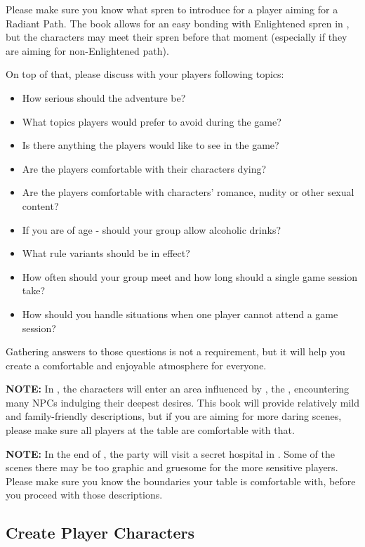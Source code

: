 Please make sure you know what spren to introduce for a player aiming for a Radiant Path. The book allows for an easy bonding with Enlightened spren in , but the characters may meet their spren before that moment (especially if they are aiming for non-Enlightened path).

On top of that, please discuss with your players following topics:
\begin{itemize}
	\item How serious should the adventure be?
	\item What topics players would prefer to avoid during the game?
	\item Is there anything the players would like to see in the game?
	\item Are the players comfortable with their characters dying?
	\item Are the players comfortable with characters’ romance, nudity or other sexual content?
	\item If you are of age - should your group allow alcoholic drinks?
	\item What rule variants should be in effect?
	\item How often should your group meet and how long should a single game session take?
	\item How should you handle situations when one player cannot attend a game session?
\end{itemize}

Gathering answers to those questions is not a requirement, but it will help you create a comfortable and enjoyable atmosphere for everyone.

\textbf{NOTE:} In , the characters will enter an area influenced by \npcHeartRevel{}, the \npcHeartRevelTitle{}, encountering many NPCs indulging their deepest desires. This book will provide relatively mild and family-friendly descriptions, but if you are aiming for more daring scenes, please make sure all players at the table are comfortable with that.

\textbf{NOTE:} In the end of , the party will visit a secret hospital in \locationKharbranth{}. Some of the scenes there may be too graphic and gruesome for the more sensitive players. Please make sure you know the boundaries your table is comfortable with, before you proceed with those descriptions.

\subsection{Create Player Characters}

